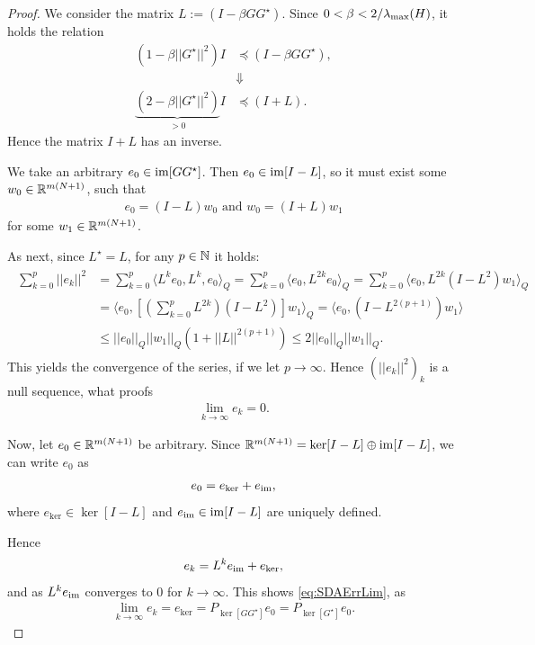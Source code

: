 \begin{proof}
	We consider the matrix $L:= ( I -\beta G G^\star)$. Since $0 <\beta < 2/\lambda_{\mathrm{max}}(H)$, it holds the relation
	\begin{align}
	(1 - \beta || G^\star ||^2 )I &\preceq (I - \beta G G^\star),\\
	&\Downarrow\\
	\label{eq:alg:proof1}
	\underbrace{(2 - \beta ||G^\star||^2)}_{> 0} I &\preceq (I + L).
	\end{align}
	Hence the matrix $I + L$ has an inverse.
	 
	We take an arbitrary $e_0 \in \operatorname{im} [G G^\star]$. Then $e_0 \in \operatorname{im} [I - L]$, so it must exist some $w_0 \in {\mathbb{R}}^{m (N+1)}$, such that 
	\begin{align}
	e_0 = (I - L)w_0 \text{ and } w_0 = (I + L)w_1
	\end{align}
	for some $w_1 \in {\mathbb{R}}^{m(N+1)}$. 
	
	As next, since $L^\star = L$, for any $p \in {\mathbb{N}}$ it holds: 
	\begin{align}
\begin{split}
	\sum_{k = 0}^p ||e_k||^2 &= \sum_{k = 0}^p \langle L^k e_0, L^k, e_0  \rangle_Q = \sum_{k = 0}^p\langle e_0 , L^{2k}e_0\rangle_Q = \sum_{k = 0}^p \langle e_0, L^{2k} (I - L^2) w_1 \rangle_Q \\
	&= \langle e_0, \left[\left(\sum_{k = 0}^p L^{2k}\right) (I - L^2)\right]w_1\rangle_Q = \langle e_0 , \left( I - L^{2(p+1)}\right)w_1\rangle \\
	&\leq ||e_0||_Q ||w_1||_Q \left(1 + ||L||^{2(p+1)}\right) \leq 2 ||e_0||_Q ||w_1||_Q.
\end{split}	\end{align}
This yields the convergence of the series, if we let  $p \to \infty$. Hence $\left(||e_k||^2\right)_k$ is a null sequence, what proofs  
	\begin{align}
	\lim_{k \to \infty}e_k = 0.
	\end{align}
	
	Now, let $e_0 \in {\mathbb{R}}^{m(N+1)}$ be arbitrary. Since ${\mathbb{R}}^{m ( N+1)} = \ker [I - L] \oplus \operatorname{im} [I - L]$, we can write $e_0$ as 
	\begin{align}
	e_0 = e_{\ker} + e_{\operatorname{im}},
	\end{align}
	where $e_{\ker} \in \ker [I - L]$ and $e_{\operatorname{im}} \in \operatorname{im} [I - L]$ are uniquely defined.
	
	Hence 
	\begin{align}
	e_k = L^ke_{\operatorname{im}} + e_{\ker},
	\end{align}
	and as $L^ke_{\operatorname{im}}$ converges to 0 for $k \to \infty$.
	This shows \eqref{eq:SDAErrLim}, as  
	\begin{align}
	\lim_{k \to \infty} e_k = e_{\ker} = P_{\ker[GG^\star]}e_0 = P_{\ker[G^\star]}e_0.
	\end{align}	
\end{proof}

